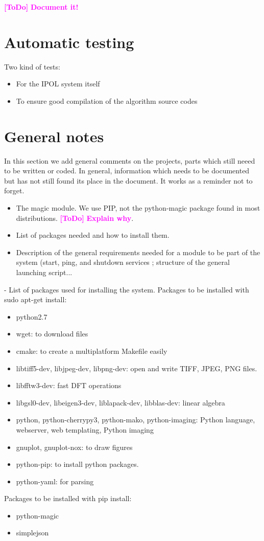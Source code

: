 \documentclass[a4paper,12pt]{article}
\newcommand{\ToDo}[1]{\textcolor{magenta}{\textbf{[ToDo]} \textbf{#1}}}
\begin{document}




\ToDo{Document it!}

\section{Automatic testing}
Two kind of tests:
\begin{itemize}
  \item For the IPOL system itself
  \item To ensure good compilation of the algorithm source codes
\end{itemize}

\section{General notes}
In this section we add general comments on the projects, parts which still neeed to be written or coded. In general, information which needs to be documented but has not still found its place in the document. It works as a reminder not to forget.

\begin{itemize}
  \item The magic module. We use PIP, not the python-magic package found in most distributions. \ToDo{Explain why}.
  \item List of packages needed and how to install them.
  \item Description of the general requirements needed for a module to be part of the system (start, ping, and shutdown services ; structure of the general launching script...
\end{itemize}

- List of packages used for installing the system. Packages to be installed with sudo apt-get install:

\begin{itemize}
\item python2.7
\item wget: to download files
\item cmake: to create a multiplatform Makefile easily
\item libtiff5-dev, libjpeg-dev, libpng-dev: open and write TIFF, JPEG, PNG files.
\item libfftw3-dev: fast DFT operations
\item libgsl0-dev, libeigen3-dev, liblapack-dev, libblas-dev: linear algebra
\item python, python-cherrypy3, python-mako, python-imaging: Python language, webserver, web templating, Python imaging
\item gnuplot, gnuplot-nox: to draw figures
\item python-pip: to install python packages. 
\item python-yaml: for parsing
\end{itemize}
Packages to be installed with pip install:
\begin{itemize}
\item python-magic
\item simplejson
\end{itemize}
\end{document}

